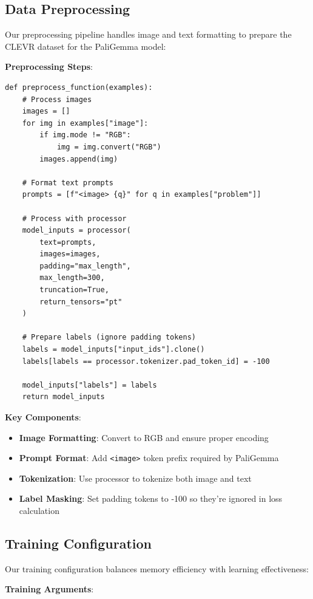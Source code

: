\documentclass[conference]{IEEEtran}
\begin{document}
\subsection{Data Preprocessing}

Our preprocessing pipeline handles image and text formatting to prepare the CLEVR dataset for the PaliGemma model:

\textbf{Preprocessing Steps}:

\begin{lstlisting}[caption={Data Preprocessing Function}]
def preprocess_function(examples):
    # Process images
    images = []
    for img in examples["image"]:
        if img.mode != "RGB":
            img = img.convert("RGB")
        images.append(img)
    
    # Format text prompts
    prompts = [f"<image> {q}" for q in examples["problem"]]
    
    # Process with processor
    model_inputs = processor(
        text=prompts,
        images=images,
        padding="max_length",
        max_length=300,
        truncation=True,
        return_tensors="pt"
    )
    
    # Prepare labels (ignore padding tokens)
    labels = model_inputs["input_ids"].clone()
    labels[labels == processor.tokenizer.pad_token_id] = -100
    
    model_inputs["labels"] = labels
    return model_inputs
\end{lstlisting}

\textbf{Key Components}:
\begin{itemize}
    \item \textbf{Image Formatting}: Convert to RGB and ensure proper encoding
    \item \textbf{Prompt Format}: Add \texttt{<image>} token prefix required by PaliGemma
    \item \textbf{Tokenization}: Use processor to tokenize both image and text
    \item \textbf{Label Masking}: Set padding tokens to -100 so they're ignored in loss calculation
\end{itemize}

\subsection{Training Configuration}

Our training configuration balances memory efficiency with learning effectiveness:

\textbf{Training Arguments}:
\end{document}
